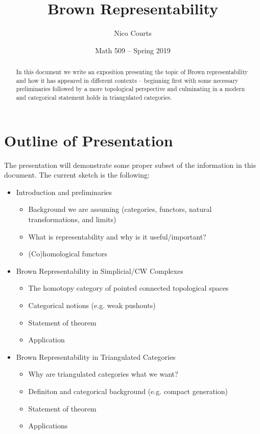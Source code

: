 \documentclass[12pt]{article}
\begin{document}
\title{Brown Representability\vspace{-1ex}}
\author{Nico Courts}
\date{Math 509 -- Spring 2019}
\maketitle

\renewcommand{\abstractname}{Introduction}
\begin{abstract}
  In this document we write an exposition presenting the topic of Brown representability and how it has appeared in different contexts -- beginning first with some necessary preliminaries followed by a more topological perspective and culminating in a modern and categorical statement holds in triangulated categories.
\end{abstract}
\tableofcontents

\newpage
\section{Outline of Presentation}
The presentation will demonstrate some proper subset of the information in this document. The current sketch is the following:
\begin{itemize}
	\item Introduction and preliminaries
	\begin{itemize}
		\item Background we are assuming (categories, functors, natural transformations, and limits)
		\item What is representability and why is it useful/important?
		\item (Co)homological functors
	\end{itemize}
	\item Brown Representability in Simplicial/CW Complexes
	\begin{itemize}
		\item The homotopy category of pointed connected topological spaces
		\item Categorical notions (e.g. weak pushouts)
		\item Statement of theorem
		\item Application
	\end{itemize}
	\item Brown Representability in Triangulated Categories
	\begin{itemize}
		\item Why are triangulated categories what we want?
		\item Definiton and categorical background (e.g. compact generation)
		\item Statement of theorem
		\item Applications
	\end{itemize}
\end{itemize}
\end{document}
